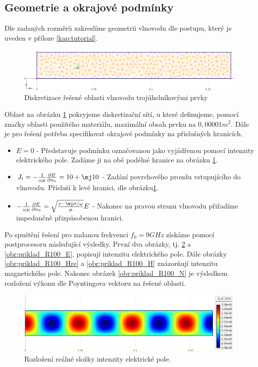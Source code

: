 \subsection*{Geometrie a okrajové podmínky}
Dle zadaných rozměrů zakreslíme geometrii vlnovodu dle postupu, který je uveden v příloze \ref{kap:tutorial}. 
\begin{figure}[!h]
	\centering
	\includegraphics[width=15cm]{priklad_R100_diskretizace.png}
	\caption{Diskretizace řešené oblasti vlnovodu trojúhelníkovými prvky}
	\label{obr:priklad_R100_diskretizace}
\end{figure}
Oblast na obrázku \ref{obr:priklad_R100_diskretizace} pokryjeme diskretizační sítí, u které definujeme, pomocí značky oblasti použitého materiálu, maximální obsah prvku na $0,00001 \unit{m^{2}}$. Dále je pro řešení potřeba specifikovat okrajové podmínky na příslušných hranicích.
\begin{itemize}
\item $E = 0$ - Představuje podmínku označovanou jako  vyjádřenou pomocí intenzity elektrického pole. Zadáme ji na obě podélné hranice na obrázku \ref{obr:priklad_R100_diskretizace}.
\item $J_{t} = -\frac{1}{\omega\mu}\frac{\partial E}{\partial n_{0}} = 10 + \mj10$ - Zadání povrchového proudu vstupujícího do vlnovodu. Přísluší k levé hranici, dle obrázku\ref{obr:priklad_R100_diskretizace}.
\item $-\frac{1}{\omega\mu}\frac{\partial E}{\partial n_{0}} = \sqrt{\frac{\varepsilon - \mj\sigma/\omega}{\mu}}E$ - Nakonec na pravou stranu vlnovodu přiřadíme impedančně přizpůsobenou hranici.
\end{itemize}
Po spuštění řešení pro zadanou frekvenci $f_0 = 9\unit{GHz}$ získáme pomocí postprocesoru následující výsledky. První dva obrázky, tj. \ref{obr:priklad_R100_Ere} a \ref{obr:priklad_R100_E}, popisují intenzitu elektrického pole. Dále obrázky \ref{obr:priklad_R100_Hre} a \ref{obr:priklad_R100_H} znázorňují intenzitu magnetického pole. Nakonec obrázek \ref{obr:priklad_R100_N} je výsledkem rozložení výkonu dle Poyntingova vektoru na řešené oblasti.
\begin{figure}[!h]
	\centering
	\includegraphics[width=15cm]{priklad_R100_Ere.png}
	\caption{Rozložení reálné složky intenzity elektrické pole.}
	\label{obr:priklad_R100_Ere}
\end{figure}
